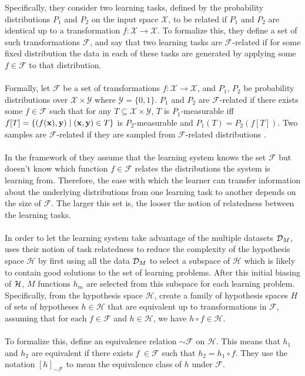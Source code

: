 Specifically, they consider two learning tasks, defined by the probability distributions $P_1$ and $P_2$ on the input space $\mathcal{X}$, to be related if $P_1$ and $P_2$ are identical up to a transformation $f: \mathcal{X} \to \mathcal{X}$. To formalize this, they define a set of such transformations $\mathcal{F}$, and say that two learning tasks are $\mathcal{F}$-related if for some fixed distribution the data in each of these tasks are generated by applying some $f \in \mathcal{F}$ to that distribution.
\\\\
Formally, let $\mathcal{F}$ be a set of transformations $f: \mathcal{X} \to \mathcal{X}$, and $P_1$, $P_2$ be probability distributions over $\mathcal{X} \times \mathcal{Y}$ where $\mathcal{Y} = \{0,1\}$. $P_1$ and $P_2$ are $\mathcal{F}$-related if there exists some $f \in \mathcal{F}$ such that for any $T \subseteq \mathcal{X} \times \mathcal{Y}$, $T$ is $P_1$-measurable iff $f[T] = \{(f(\mathbf{x}), \mathbf{y}) \mid (\mathbf{x}, \mathbf{y}) \in T\}$ is $P_2$-measurable and $P_1(T) = P_2(f[T])$. Two samples are $\mathcal{F}$-related if they are sampled from $\mathcal{F}$-related distributions \citep{ben2003}.
\\\\
In the framework of \citet{ben2003} they assume that the learning system knows the set $\mathcal{F}$ but doesn't know which function $f \in \mathcal{F}$ relates the distributions the system is learning from. Therefore, the ease with which the learner can transfer information about the underlying distributions from one learning task to another depends on the size of $\mathcal{F}$. The larger this set is, the looser the notion of relatedness between the learning tasks.
\\\\
In order to let the learning system take advantage of the multiple datasets $\mathcal{D}_M$, \citet{ben2003} uses their notion of task relatedness to reduce the complexity of the hypothesis space $\mathcal{H}$ by first using all the data $\mathcal{D}_M$ to select a subspace of $\mathcal{H}$ which is likely to contain good solutions to the set of learning problems. After this initial biasing of $\mathcal{H}$, $M$ functions $h_m$ are selected from this subspace for each learning problem. Specifically, from the hypothesis space $\mathcal{H}$, create a family of hypothesis spaces $H$ of sets of hypotheses $h \in \mathcal{H}$ that are equivalent up to transformations in $\mathcal{F}$, assuming that for each $f \in \mathcal{F}$ and $h \in \mathcal{H}$, we have $h \circ f \in \mathcal{H}$. 
\\\\
To formalize this, \citet{ben2003} define an equivalence relation $\sim \mathcal{F}$ on $\mathcal{H}$. This means that $h_1$ and $h_2$ are equivalent if there exists $f\ \in \mathcal{F}$ such that $h_2 = h_1 \circ f$. They use the notation $[h]_{\sim \mathcal{F}}$ to mean the equivalence class of $h$ under $\mathcal{F}$. 

